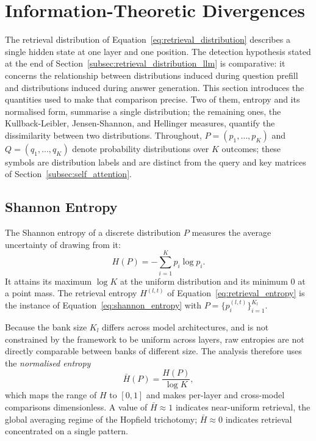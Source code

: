 \section{Information-Theoretic Divergences}
\label{sec:divergences}

The retrieval distribution of Equation~\eqref{eq:retrieval_distribution}
describes a single hidden state at one layer and one position. The detection
hypothesis stated at the end of
Section~\ref{subsec:retrieval_distribution_llm} is comparative: it concerns
the relationship between distributions induced during question prefill and
distributions induced during answer generation. This section introduces the
quantities used to make that comparison precise. Two of them, entropy and its
normalised form, summarise a single distribution; the remaining ones, the
Kullback-Leibler, Jensen-Shannon, and Hellinger measures, quantify the
dissimilarity between two distributions. Throughout, $P = (p_1, \ldots, p_K)$
and $Q = (q_1, \ldots, q_K)$ denote probability distributions over $K$
outcomes; these symbols are distribution labels and are distinct from the
query and key matrices of Section~\ref{subsec:self_attention}.

\subsection{Shannon Entropy}
\label{subsec:shannon_entropy}

The Shannon entropy of a discrete distribution $P$
\citep{shannon1948mathematical} measures the average uncertainty of drawing
from it:
\begin{equation}
    H(P) = -\sum_{i=1}^{K} p_i \log p_i.
    \label{eq:shannon_entropy}
\end{equation}
It attains its maximum $\log K$ at the uniform distribution and its minimum
$0$ at a point mass. The retrieval entropy $H^{(l,t)}$ of
Equation~\eqref{eq:retrieval_entropy} is the instance of
Equation~\eqref{eq:shannon_entropy} with $P = \{p_i^{(l,t)}\}_{i=1}^{K_l}$.

Because the bank size $K_l$ differs across model architectures, and is not
constrained by the framework to be uniform across layers, raw entropies are
not directly comparable between banks of different size. The analysis therefore
uses the \emph{normalised entropy}
\begin{equation}
    \bar{H}(P) = \frac{H(P)}{\log K},
    \label{eq:normalised_entropy}
\end{equation}
which maps the range of $H$ to $[0,1]$ and makes per-layer and cross-model
comparisons dimensionless. A value of $\bar{H} \approx 1$ indicates
near-uniform retrieval, the global averaging regime of the Hopfield
trichotomy; $\bar{H} \approx 0$ indicates retrieval concentrated on a single
pattern.

